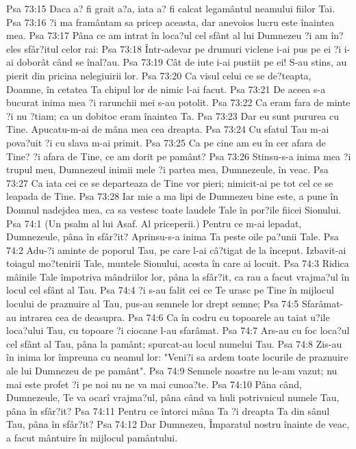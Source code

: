 Psa 73:15  Daca a? fi grait a?a, iata a? fi calcat legamântul neamului fiilor Tai.
Psa 73:16  ?i ma framântam sa pricep aceasta, dar anevoios lucru este înaintea mea.
Psa 73:17  Pâna ce am intrat în loca?ul cel sfânt al lui Dumnezeu ?i am în?eles sfâr?itul celor rai:
Psa 73:18  Într-adevar pe drumuri viclene i-ai pus pe ei ?i i-ai doborât când se înal?au.
Psa 73:19  Cât de iute i-ai pustiit pe ei! S-au stins, au pierit din pricina nelegiuirii lor.
Psa 73:20  Ca visul celui ce se de?teapta, Doamne, în cetatea Ta chipul lor de nimic l-ai facut.
Psa 73:21  De aceea s-a bucurat inima mea ?i rarunchii mei s-au potolit.
Psa 73:22  Ca eram fara de minte ?i nu ?tiam; ca un dobitoc eram înaintea Ta.
Psa 73:23  Dar eu sunt pururea cu Tine. Apucatu-m-ai de mâna mea cea dreapta.
Psa 73:24  Cu sfatul Tau m-ai pova?uit ?i cu slava m-ai primit.
Psa 73:25  Ca pe cine am eu în cer afara de Tine? ?i afara de Tine, ce am dorit pe pamânt?
Psa 73:26  Stinsu-s-a inima mea ?i trupul meu, Dumnezeul inimii mele ?i partea mea, Dumnezeule, în veac.
Psa 73:27  Ca iata cei ce se departeaza de Tine vor pieri; nimicit-ai pe tot cel ce se leapada de Tine.
Psa 73:28  Iar mie a ma lipi de Dumnezeu bine este, a pune în Domnul nadejdea mea, ca sa vestesc toate laudele Tale în por?ile fiicei Sionului.
Psa 74:1  (Un psalm al lui Asaf. Al priceperii.) Pentru ce m-ai lepadat, Dumnezeule, pâna în sfâr?it? Aprinsu-s-a inima Ta peste oile pa?unii Tale.
Psa 74:2  Adu-?i aminte de poporul Tau, pe care l-ai câ?tigat de la început. Izbavit-ai toiagul mo?tenirii Tale, muntele Sionului, acesta în care ai locuit.
Psa 74:3  Ridica mâinile Tale împotriva mândriilor lor, pâna la sfâr?it, ca rau a facut vrajma?ul în locul cel sfânt al Tau.
Psa 74:4  ?i s-au falit cei ce Te urasc pe Tine în mijlocul locului de praznuire al Tau, pus-au semnele lor drept semne;
Psa 74:5  Sfarâmat-au intrarea cea de deasupra.
Psa 74:6  Ca în codru cu topoarele au taiat u?ile loca?ului Tau, cu topoare ?i ciocane l-au sfarâmat.
Psa 74:7  Ars-au cu foc loca?ul cel sfânt al Tau, pâna la pamânt; spurcat-au locul numelui Tau.
Psa 74:8  Zis-au în inima lor împreuna cu neamul lor: "Veni?i sa ardem toate locurile de praznuire ale lui Dumnezeu de pe pamânt".
Psa 74:9  Semnele noastre nu le-am vazut; nu mai este profet ?i pe noi nu ne va mai cunoa?te.
Psa 74:10  Pâna când, Dumnezeule, Te va ocarî vrajma?ul, pâna când va huli potrivnicul numele Tau, pâna în sfâr?it?
Psa 74:11  Pentru ce întorci mâna Ta ?i dreapta Ta din sânul Tau, pâna în sfâr?it?
Psa 74:12  Dar Dumnezeu, Împaratul nostru înainte de veac, a facut mântuire în mijlocul pamântului.
